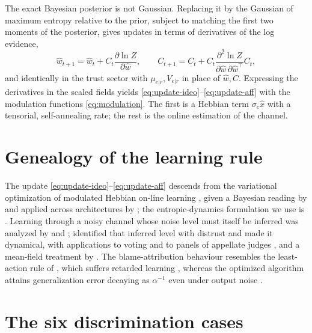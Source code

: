 \documentclass{article}
\begin{document}
The exact Bayesian posterior is not Gaussian. Replacing it by the Gaussian of
maximum entropy relative to the prior, subject to matching the first two moments
of the posterior, gives updates in terms of derivatives of the log evidence,
%
\begin{equation}
  \hat{w}_{t+1} = \hat{w}_t + C_t\frac{\partial \ln Z}{\partial \hat{w}},
  \qquad
  C_{t+1} = C_t + C_t \frac{\partial^{2}\ln Z}{\partial\hat{w}\,\partial\hat{w}^{\!\top}} C_t,
\end{equation}
%
and identically in the trust sector with $\mu_{e|r}, V_{e|r}$ in place of
$\hat{w}, C$. Expressing the derivatives in the scaled fields yields
\eqref{eq:update-ideo}--\eqref{eq:update-aff} with the modulation functions
\eqref{eq:modulation}. The first is a Hebbian term $\sigma_e\hat{x}$ with a
tensorial, self-annealing rate; the rest is the online estimation of the channel.

\section{Genealogy of the learning rule}
\label{app:genealogy}

The update \eqref{eq:update-ideo}--\eqref{eq:update-aff} descends from the
variational optimization of modulated Hebbian on-line learning
\citep{kinouchi1992optimal,kinzel1990improving}, given a Bayesian reading by
\citet{opper1996online,opper1998bayesian} and applied across architectures by
\citet{solla1999optimal}; the entropic-dynamics formulation we use is
\citet{caticha2020entropic}. Learning through a noisy channel whose noise level
must itself be inferred was analyzed by \citet{kinouchi1993lower} and
\citet{biehl1995learning}; \citet{alves2016distrust} identified that inferred
level with distrust and made it dynamical, with applications to voting
\citep{caticha2015whom} and to panels of appellate judges
\citep{caticha2019trust}, and a mean-field treatment by \citet{simoes2018mean}.
The blame-attribution behaviour resembles the least-action rule of
\citet{mitchison1989bounds}, which suffers retarded learning
\citep{kabashima1994perfect}, whereas the optimized algorithm attains
generalization error decaying as $\alpha^{-1}$ even under output noise
\citep{simonetti1996online}.

\section{The six discrimination cases}
\label{app:cases}
\end{document}
